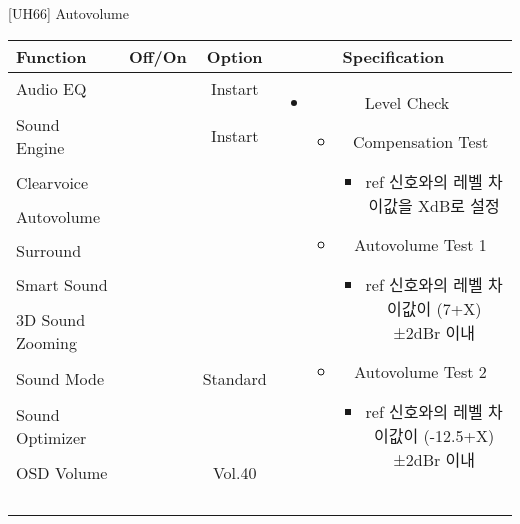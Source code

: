 \begin{frame}[t]{[UH66] Autovolume}
\begin{tiny}
\begin{tabular}{@{}lccc@{}}
\toprule
Function & Off/On & Option & Specification \\
\midrule
Audio EQ & \color{black}{Off} & Instart &
\multirow{10}{60mm}{
\begin{itemize}
\item Level Check
	\begin{itemize}
	\item Compensation Test
		\begin{itemize}\tiny
		\item ref 신호와의 레벨 차이값을 XdB로 설정
		\end{itemize}
	\item Autovolume Test 1
		\begin{itemize}\tiny
		\item ref 신호와의 레벨 차이값이 (7+X)±2dBr 이내
		\end{itemize}
	\item Autovolume Test 2
		\begin{itemize}\tiny
		\item ref 신호와의 레벨 차이값이 (-12.5+X)±2dBr 이내
		\end{itemize}
	\end{itemize}
\end{itemize}
} \\
Sound Engine & \color{blue}{On} & Instart & \\
Clearvoice & \color{black}{Off} & & \\
Autovolume & \color{blue}{On} & & \\
Surround & \color{black}{Off} & & \\
Smart Sound & \color{black}{Off} & & \\
3D Sound Zooming & \color{black}{Off} & & \\
Sound Mode & \color{blue}{On} & Standard & \\
Sound Optimizer & \color{black}{Off} & & \\
OSD Volume & \color{blue}{On} & Vol.40 & \\
& & & \\
& & & \\
& & & \\
& & & \\
\midrule
\end{tabular}
\end{tiny}

\end{frame}
